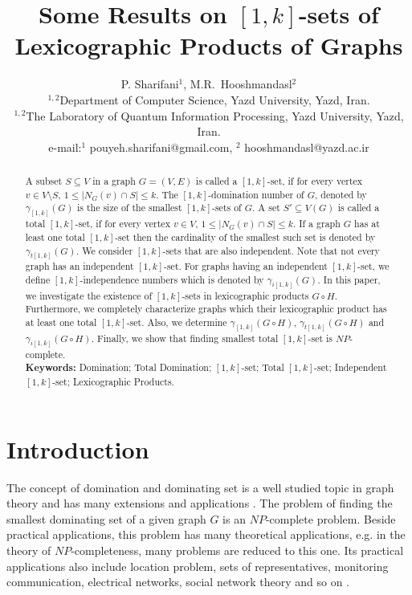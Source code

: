 \documentclass[A4,12pt]{article}
\title{Some Results on $[1, k]$-sets of Lexicographic Products of Graphs}
\author{P. Sharifani$^{1}$, M.R.~Hooshmandasl$^{2}$\\
	\footnotesize{$^{1,2}$Department of Computer Science, Yazd University, Yazd, Iran.}\\
	\footnotesize{$^{1,2}$The Laboratory of Quantum Information Processing, Yazd University, Yazd, Iran.}  \\
	\footnotesize{e-mail:$^1$ pouyeh.sharifani@gmail.com, $^2$ hooshmandasl@yazd.ac.ir}}
\date{}
\theoremstyle{definition}
\theoremstyle{remark}
\begin{document}
	
	\maketitle
	
	\begin{abstract}
		A subset $S \subseteq V$ in a graph $G = (V,E)$ is called  a $[1, k]$-set,	 if for every vertex $v \in V \setminus S$, $1 \leq \vert N_G(v) \cap S \vert \leq k$.		
		The $[1,k]$-domination number of $G$,  denoted by  $\gamma_{[1, k]}(G)$ is the size of the smallest $[1,k]$-sets of $G$.
		A set $S'\subseteq V(G)$ is called a total $[1,k]$-set, if for every vertex $v \in V$, $1 \leq \vert N_G(v) \cap S \vert \leq k$.
		If a graph $G$ has at least one total $[1, k]$-set then the cardinality of the smallest such set  is denoted by $\gamma_{t[1, k]}(G)$.
		We consider $[1, k]$-sets that are also independent. Note that not every graph has an independent $[1, k]$-set. For graphs having an independent $[1, k]$-set, we define  $[1, k]$-independence numbers which is denoted by $\gamma_{i[1, k]}(G)$.
		In this paper, we investigate the existence of $[1,k]$-sets in lexicographic products $G\circ H$. Furthermore, we  completely characterize graphs which their lexicographic product has  at least one total $[1,k]$-set. Also, we determine $\gamma_{[1, k]}(G\circ H)$, $\gamma_{t[1, k]}(G\circ H)$ and $\gamma_{i[1, k]}(G\circ H)$.
		Finally, we show that finding smallest total $[1, k]$-set is $NP$-complete.\\
		
		\noindent\textbf{Keywords:} Domination; Total Domination; $[1,k]$-set; Total $[1,k]$-set; Independent $[1,k]$-set; Lexicographic Products.
	\end{abstract}
	
	
	
	\section{Introduction}
	The concept of domination and dominating set is a well studied topic in graph theory and has many extensions and applications \cite{haynes1998fundamentals, hedetniemi1991topics}.
	The problem of finding the smallest dominating set of a given graph $G$ is an $NP$-complete problem. Beside practical applications, this problem has many theoretical applications, e.g. in the theory of $NP$-completeness, many problems are reduced to this one.
	Its practical applications also include location problem, sets of representatives, monitoring communication, electrical networks, social network theory and so on \cite{haynes1998fundamentals, haynes1998domination, hedetniemi1991topics}.
	
\end{document}
